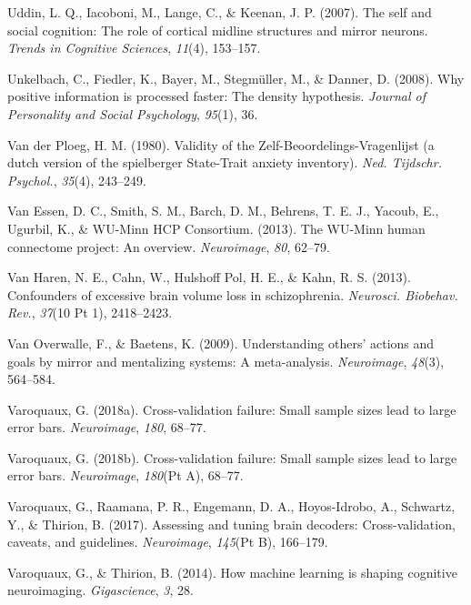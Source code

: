 \documentclass[11pt,american,]{memoir} %
\begin{document}
\leavevmode\hypertarget{ref-uddin2007self}{}%
Uddin, L. Q., Iacoboni, M., Lange, C., \& Keenan, J. P. (2007). The self and social cognition: The role of cortical midline structures and mirror neurons. \emph{Trends in Cognitive Sciences}, \emph{11}(4), 153--157.

\leavevmode\hypertarget{ref-unkelbach2008positive}{}%
Unkelbach, C., Fiedler, K., Bayer, M., Stegmüller, M., \& Danner, D. (2008). Why positive information is processed faster: The density hypothesis. \emph{Journal of Personality and Social Psychology}, \emph{95}(1), 36.

\leavevmode\hypertarget{ref-Van_der_Ploeg1980-tq}{}%
Van der Ploeg, H. M. (1980). Validity of the Zelf-Beoordelings-Vragenlijst (a dutch version of the spielberger State-Trait anxiety inventory). \emph{Ned. Tijdschr. Psychol.}, \emph{35}(4), 243--249.

\leavevmode\hypertarget{ref-Van_Essen2013-df}{}%
Van Essen, D. C., Smith, S. M., Barch, D. M., Behrens, T. E. J., Yacoub, E., Ugurbil, K., \& WU-Minn HCP Consortium. (2013). The WU-Minn human connectome project: An overview. \emph{Neuroimage}, \emph{80}, 62--79.

\leavevmode\hypertarget{ref-Van_Haren2013-iv}{}%
Van Haren, N. E., Cahn, W., Hulshoff Pol, H. E., \& Kahn, R. S. (2013). Confounders of excessive brain volume loss in schizophrenia. \emph{Neurosci. Biobehav. Rev.}, \emph{37}(10 Pt 1), 2418--2423.

\leavevmode\hypertarget{ref-van2009understanding}{}%
Van Overwalle, F., \& Baetens, K. (2009). Understanding others' actions and goals by mirror and mentalizing systems: A meta-analysis. \emph{Neuroimage}, \emph{48}(3), 564--584.

\leavevmode\hypertarget{ref-varoquaux2018cross}{}%
Varoquaux, G. (2018a). Cross-validation failure: Small sample sizes lead to large error bars. \emph{Neuroimage}, \emph{180}, 68--77.

\leavevmode\hypertarget{ref-Varoquaux2018-uo}{}%
Varoquaux, G. (2018b). Cross-validation failure: Small sample sizes lead to large error bars. \emph{Neuroimage}, \emph{180}(Pt A), 68--77.

\leavevmode\hypertarget{ref-Varoquaux2017-fj}{}%
Varoquaux, G., Raamana, P. R., Engemann, D. A., Hoyos-Idrobo, A., Schwartz, Y., \& Thirion, B. (2017). Assessing and tuning brain decoders: Cross-validation, caveats, and guidelines. \emph{Neuroimage}, \emph{145}(Pt B), 166--179.

\leavevmode\hypertarget{ref-Varoquaux2014-su}{}%
Varoquaux, G., \& Thirion, B. (2014). How machine learning is shaping cognitive neuroimaging. \emph{Gigascience}, \emph{3}, 28.
\end{document}
